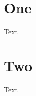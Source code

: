\documentclass{article}
\begin{document}
%
\ExplSyntaxOn
{}

\def\etocaftertochook{\meaning\l__tag_para_bool{}\par}
\ExplSyntaxOff
\tableofcontents

\section{One}

Text

\section{Two}

Text
\end{document}

